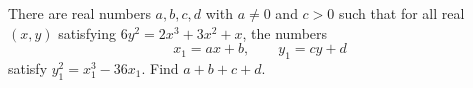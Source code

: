 There are real numbers $a,b,c,d$ with $a\ne0$ and $c>0$ such that for all real $(x,y)$ satisfying $6y^2=2x^3+3x^2+x$, the numbers
\[
x_1=ax+b,\qquad y_1=cy+d
\]
satisfy $y_1^2=x_1^3-36x_1$. Find $a+b+c+d$.
